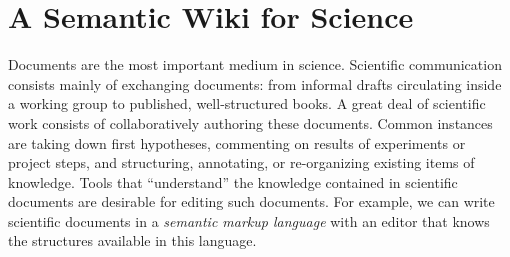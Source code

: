 \section{A Semantic Wiki for Science}
\label{sec:science}



\begin{figure}
  \centering
  \vspace{-.9cm}
  \vspace{-1.2cm}
\end{figure}
Documents are the most important medium in science.
Scientific
communication consists mainly of exchanging documents: from informal drafts circulating
inside a working group to published, well-structured books.  A great deal of scientific
work consists of collaboratively authoring these documents. 
Common instances are taking down first hypotheses,
commenting on results of experiments or project steps, and structuring, annotating,
or re-organizing existing items of knowledge.  Tools that
``understand'' the knowledge contained in scientific documents are desirable for
editing such documents.  For example, we can  write scientific documents in a
\textit{semantic markup language} with an editor that knows the structures available in this
language. 

